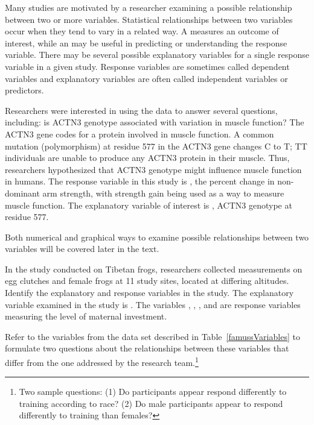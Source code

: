 Many studies are motivated by a researcher examining a possible relationship between two or more variables. Statistical relationships between two variables occur when they tend to vary in a related way. A  measures an outcome of interest, while an  may be useful in predicting or understanding the response variable. There may be several possible explanatory variables for a single response variable in a given study.  Response variables are sometimes called dependent variables and explanatory variables are often called independent variables or predictors.  

Researchers were interested in using the  data to answer several questions, including: is ACTN3 genotype associated with variation in muscle function? The ACTN3 gene codes for a protein involved in muscle function. A common mutation (polymorphism) at residue 577 in the ACTN3 gene changes C to T; TT individuals are unable to produce any ACTN3 protein in their muscle. Thus, researchers hypothesized that ACTN3 genotype might influence muscle function in humans. The response variable in this study is , the percent change in non-dominant arm strength, with strength gain being used as a way to measure muscle function. The explanatory variable of interest is , ACTN3 genotype at residue 577.  

Both numerical and graphical ways to examine possible relationships between two variables will be covered later in the text.

\begin{example}{In the study conducted on Tibetan frogs, researchers collected measurements on egg clutches and female frogs at 11 study sites, located at differing altitudes. Identify the explanatory and response variables in the study.}
The explanatory variable examined in the study is . The variables , , , and  are response variables measuring the level of maternal investment. 
\end{example}	


\begin{exercise}
Refer to the variables from the  data set described in Table~\ref{famussVariables} to formulate two questions about the relationships between these variables that differ from the one addressed by the research team.\footnote{Two sample questions: (1)  Do participants appear respond differently to training according to race?  (2)  Do male participants appear to respond differently to training than females?}
\end{exercise}



